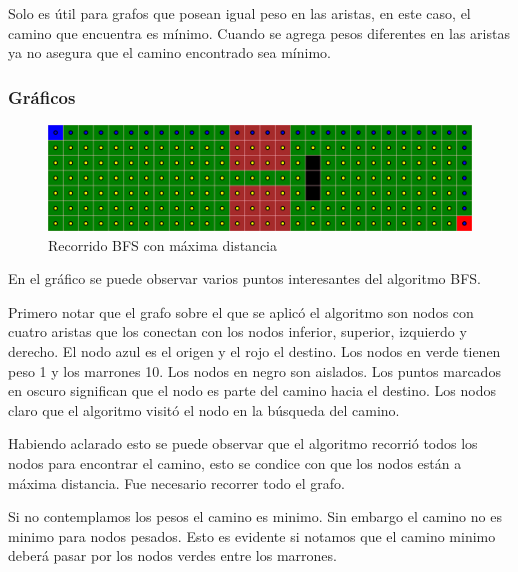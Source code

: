 Solo es útil para grafos que posean igual peso en las aristas, en este caso, el camino que encuentra es mínimo. Cuando se agrega pesos diferentes en las aristas ya no asegura que el camino encontrado sea mínimo.


\subsubsection{Gráficos}
\begin{figure}[h]
\centering
\includegraphics[width=\textwidth]{Graphics/BFSSample.png}
\caption{Recorrido BFS con máxima distancia}
\end{figure}
En el gráfico se puede observar varios puntos interesantes del algoritmo BFS. 

Primero notar que el grafo sobre el que se aplicó el algoritmo son nodos con cuatro aristas que los conectan con los nodos inferior, superior, izquierdo y derecho. El nodo azul es el origen y el rojo el destino. Los nodos en verde tienen peso 1 y los marrones 10. Los nodos en negro son aislados. 
Los puntos marcados en oscuro significan que el nodo es parte del camino hacia el destino. Los nodos claro que el algoritmo visitó el nodo en la búsqueda del camino.

Habiendo aclarado esto se puede observar que el algoritmo recorrió todos los nodos para encontrar el camino, esto se condice con que los nodos están a máxima distancia. Fue necesario recorrer todo el grafo. 

Si no contemplamos los pesos el camino es minimo. Sin embargo el camino no es minimo para nodos pesados. Esto es evidente si notamos que el camino minimo deberá pasar por los nodos verdes entre los marrones. 

